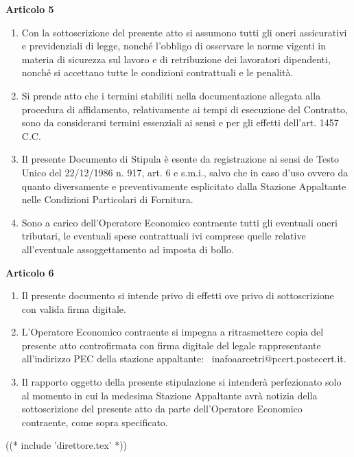 \textbf{Articolo 5}

\begin{enumerate}
	\item Con la sottoscrizione del presente atto si assumono tutti gli oneri
assicurativi e previdenziali di legge, nonché l'obbligo di osservare
le norme vigenti in materia di sicurezza sul lavoro e di retribuzione
dei lavoratori dipendenti, nonché si accettano tutte le condizioni
contrattuali e le penalità.

\item Si prende atto che i termini stabiliti nella documentazione allegata
alla procedura di affidamento, relativamente ai tempi di esecuzione del
Contratto, sono da considerarsi termini essenziali ai sensi e per gli
effetti dell'art. 1457 C.C.

\item Il presente Documento di Stipula è esente da registrazione ai sensi de
Testo Unico del 22/12/1986 n. 917, art. 6 e s.m.i., salvo che in caso
d'uso ovvero da quanto diversamente e preventivamente esplicitato dalla
Stazione Appaltante nelle Condizioni Particolari di Fornitura.

\item Sono a carico dell'Operatore Economico contraente tutti gli eventuali
oneri tributari, le eventuali spese contrattuali ivi comprese quelle
relative all'eventuale assoggettamento ad imposta di bollo.
\end{enumerate}

\textbf{Articolo 6}

\begin{enumerate}
	\item Il presente documento si intende privo di effetti ove privo di
sottoscrizione con valida firma digitale.

\item L'Operatore Economico contraente si impegna a ritrasmettere copia
del presente atto controfirmata con firma digitale del legale
rappresentante all'indirizzo PEC della stazione appaltante:
 inafoaarcetri@pcert.postecert.it.

\item Il rapporto oggetto della presente stipulazione si intenderà perfezionato
solo al momento in cui la medesima Stazione Appaltante avrà notizia
della sottoscrizione del presente atto da parte dell'Operatore Economico
contraente, come sopra specificato.
\end{enumerate}

((* include 'direttore.tex' *))



